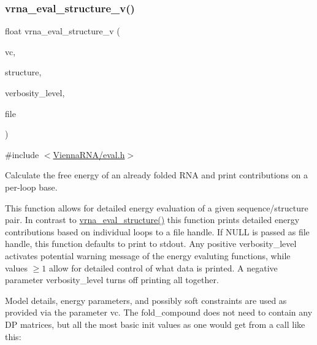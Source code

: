 \subsubsection{\texorpdfstring{vrna\_eval\_structure\_v()}{vrna\_eval\_structure\_v()}}
{\footnotesize\ttfamily float vrna\+\_\+eval\+\_\+structure\+\_\+v (\begin{DoxyParamCaption}\item[{\mbox{\hyperlink{group__fold__compound_ga1b0cef17fd40466cef5968eaeeff6166}{vrna\+\_\+fold\+\_\+compound\+\_\+t}} $\ast$}]{vc,  }\item[{const char $\ast$}]{structure,  }\item[{int}]{verbosity\+\_\+level,  }\item[{F\+I\+LE $\ast$}]{file }\end{DoxyParamCaption})}



{\ttfamily \#include $<$\mbox{\hyperlink{eval_8h}{Vienna\+R\+N\+A/eval.\+h}}$>$}



Calculate the free energy of an already folded R\+NA and print contributions on a per-\/loop base. 

This function allows for detailed energy evaluation of a given sequence/structure pair. In contrast to \mbox{\hyperlink{group__eval_ga58f199f1438d794a265f3b27fc8ea631}{vrna\+\_\+eval\+\_\+structure()}} this function prints detailed energy contributions based on individual loops to a file handle. If N\+U\+LL is passed as file handle, this function defaults to print to stdout. Any positive {\ttfamily verbosity\+\_\+level} activates potential warning message of the energy evaluting functions, while values $ \ge 1 $ allow for detailed control of what data is printed. A negative parameter {\ttfamily verbosity\+\_\+level} turns off printing all together.

Model details, energy parameters, and possibly soft constraints are used as provided via the parameter \textquotesingle{}vc\textquotesingle{}. The fold\+\_\+compound does not need to contain any DP matrices, but all the most basic init values as one would get from a call like this\+: 
\begin{DoxyCode}{0}
\end{DoxyCode}


